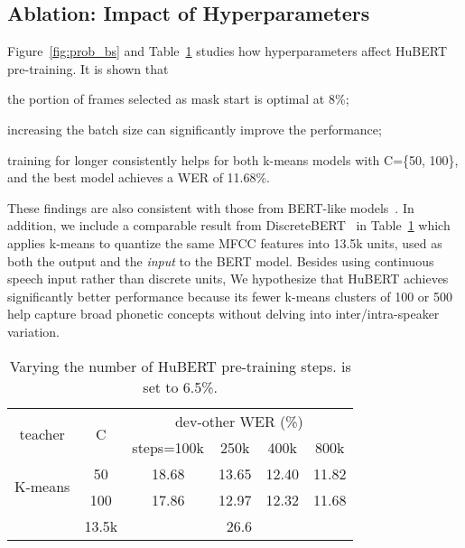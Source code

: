 \subsection{Ablation: Impact of Hyperparameters}
Figure~\ref{fig:prob_bs} and Table~\ref{tab:step} studies how hyperparameters affect HuBERT pre-training.
It is shown that
\begin{enumerate*}[label=(\arabic*)]
    \item the portion of frames selected as mask start is optimal at 8\%;
    \item increasing the batch size can significantly improve the performance; \item training for longer consistently helps for both k-means models with C=\{50, 100\}, and the best model achieves a WER of 11.68\%.
\end{enumerate*}
These findings are also consistent with those from BERT-like models~\cite{clark2020electra}. In addition, we include a comparable result from DiscreteBERT~\cite{baevski2019effectiveness} in Table~\ref{tab:step} which applies k-means to quantize the same MFCC features into 13.5k units, used as both the output and the \textit{input} to the BERT model. Besides using continuous speech input rather than discrete units, We hypothesize that HuBERT achieves significantly better performance because its fewer k-means clusters of 100 or 500 help capture broad phonetic concepts without delving into inter/intra-speaker variation. 

\begin{table}[ht]
    \centering
    \begin{tabular}{cc|cccc}
    \toprule
    \multirow{2}{*}{teacher} & \multirow{2}{*}{C} &  
    \multicolumn{4}{c}{dev-other WER (\%)} \\
    & & steps=100k & 250k & 400k & 800k \\
    \midrule
    \multirow{2}{*}{K-means}  
    & 50  & 18.68 & 13.65 & 12.40 & 11.82 \\
    & 100 & 17.86 & 12.97 & 12.32 & 11.68 \\
    \midrule
    \cite{baevski2019effectiveness} & 13.5k & \multicolumn{4}{c}{26.6} \\
    \bottomrule
\end{tabular}     \caption{Varying the number of HuBERT pre-training steps.  is set to 6.5\%.}
    \label{tab:step}
\end{table}

